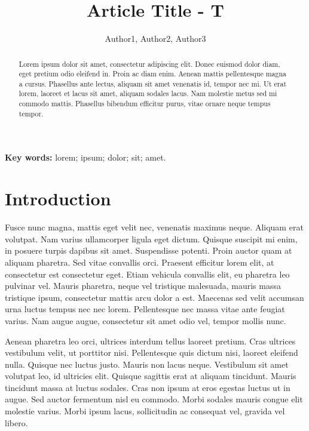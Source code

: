 \documentclass[12pt]{article}
\title{Article Title - T}
\author{Author1\inst{1}, Author2\inst{1}, Author3\inst{1}}
\begin{document}
 

\maketitle

\begin{abstract}
    Lorem ipsum dolor sit amet, consectetur adipiscing elit. Donec euismod dolor diam, eget pretium odio eleifend in. Proin ac diam enim. Aenean mattis pellentesque magna a cursus. Phasellus ante lectus, aliquam sit amet venenatis id, tempor nec mi. Ut erat lorem, laoreet et lacus sit amet, aliquam sodales lacus. Nam molestie metus sed mi commodo mattis. Phasellus bibendum efficitur purus, vitae ornare neque tempus tempor.
\end{abstract}
     

\textbf{Key words:} lorem; ipsum; dolor; sit; amet.

\section{Introduction}

    Fusce nunc magna, mattis eget velit nec, venenatis maximus neque. Aliquam erat volutpat. Nam varius ullamcorper ligula eget dictum. Quisque suscipit mi enim, in posuere turpis dapibus sit amet. Suspendisse potenti. Proin auctor quam at aliquam pharetra. Sed vitae convallis orci. Praesent efficitur lorem elit, at consectetur est consectetur eget. Etiam vehicula convallis elit, eu pharetra leo pulvinar vel. Mauris pharetra, neque vel tristique malesuada, mauris massa tristique ipsum, consectetur mattis arcu dolor a est. Maecenas sed velit accumsan urna luctus tempus nec nec lorem. Pellentesque nec massa vitae ante feugiat varius. Nam augue augue, consectetur sit amet odio vel, tempor mollis nunc.

    Aenean pharetra leo orci, ultrices interdum tellus laoreet pretium. Cras ultrices vestibulum velit, ut porttitor nisi. Pellentesque quis dictum nisi, laoreet eleifend nulla. Quisque nec luctus justo. Mauris non lacus neque. Vestibulum sit amet volutpat leo, id ultricies elit. Quisque sagittis erat at aliquam tincidunt. Mauris tincidunt massa at luctus sodales. Cras non ipsum at eros egestas luctus ut in augue. Sed auctor fermentum nisl eu commodo. Morbi sodales mauris congue elit molestie varius. Morbi ipsum lacus, sollicitudin ac consequat vel, gravida vel libero.
\end{document}
